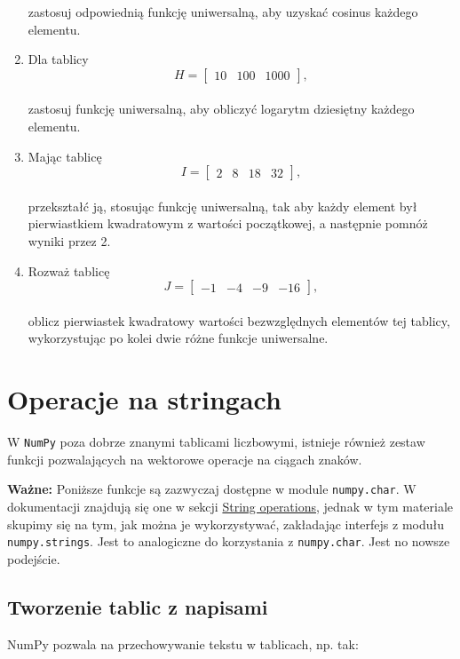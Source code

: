 \documentclass[
  polish,
  letterpaper,
  DIV=11,
  numbers=noendperiod]{scrreprt}
\begin{document}
\begin{enumerate}
  zastosuj odpowiednią funkcję uniwersalną, aby uzyskać cosinus każdego
  elementu.
\item
  Dla tablicy\\
  \[H = \begin{bmatrix}10 & 100 & 1000\end{bmatrix},\]\\
  zastosuj funkcję uniwersalną, aby obliczyć logarytm dziesiętny każdego
  elementu.
\item
  Mając tablicę\\
  \[I = \begin{bmatrix}2 & 8 & 18 & 32\end{bmatrix},\]\\
  przekształć ją, stosując funkcję uniwersalną, tak aby każdy element
  był pierwiastkiem kwadratowym z wartości początkowej, a następnie
  pomnóż wyniki przez 2.
\item
  Rozważ tablicę\\
  \[J = \begin{bmatrix}-1 & -4 & -9 & -16\end{bmatrix},\]\\
  oblicz pierwiastek kwadratowy wartości bezwzględnych elementów tej
  tablicy, wykorzystując po kolei dwie różne funkcje uniwersalne.
\end{enumerate}

\chapter{Operacje na stringach}\label{operacje-na-stringach}

W \texttt{NumPy} poza dobrze znanymi tablicami liczbowymi, istnieje
również zestaw funkcji pozwalających na wektorowe operacje na ciągach
znaków.

\textbf{Ważne:} Poniższe funkcje są zazwyczaj dostępne w module
\texttt{numpy.char}. W dokumentacji znajdują się one w sekcji
\href{https://numpy.org/doc/stable/reference/routines.strings.html}{String
operations}, jednak w tym materiale skupimy się na tym, jak można je
wykorzystywać, zakładając interfejs z modułu \texttt{numpy.strings}.
Jest to analogiczne do korzystania z \texttt{numpy.char}. Jest no nowsze
podejście.

\section{Tworzenie tablic z napisami}\label{tworzenie-tablic-z-napisami}

NumPy pozwala na przechowywanie tekstu w tablicach, np. tak:
\end{document}
